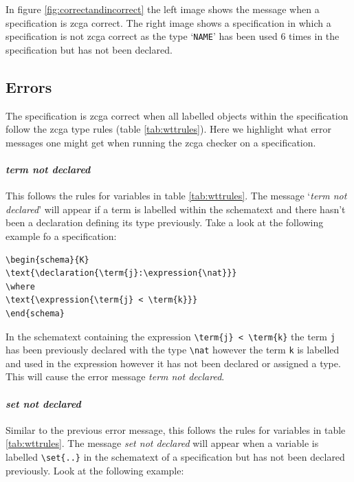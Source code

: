 In figure \ref{fig:correctandincorrect} the left image shows the message when a
specification is \gls{zcga} correct. The right image shows a specification in
which a specification is not \gls{zcga} correct as the type `\texttt{NAME}' has
been used 6 times in the specification but has not been declared.

\subsection{Errors}
\label{subsec:zcgaerrors}

The specification is \gls{zcga} correct when all labelled objects within the
specification follow the \gls{zcga} type rules (table \ref{tab:wttrules}). Here
we highlight what error messages one might get when running the \gls{zcga}
checker on a specification.


\paragraph{\emph{term not declared}}

This follows the rules for variables in table \ref{tab:wttrules}. The message
`\emph{term not declared}' will appear if a term is labelled within the
schematext and there hasn't been a declaration defining its type previously.
Take a look at the following example fo a specification:

\begin{exam}
\label{Kexam}
\begin{verbatim}
\begin{schema}{K}
\text{\declaration{\term{j}:\expression{\nat}}}
\where
\text{\expression{\term{j} < \term{k}}}
\end{schema}
\end{verbatim}
\end{exam}

In the schematext containing the expression \verb|\term{j} < \term{k}| the term
\verb|j| has been previously declared with the type \verb|\nat| however the term
\verb|k| is labelled and used in the expression however it has not been declared
or assigned a type. This will cause the error message \emph{term not declared}.

\paragraph{\emph{set not declared}}

Similar to the previous error message, this follows the rules for variables in
table \ref{tab:wttrules}. The message \emph{set not declared} will appear when a
variable is labelled \verb|\set{..}| in the schematext of a specification but has
not been declared previously. Look at the following example:

